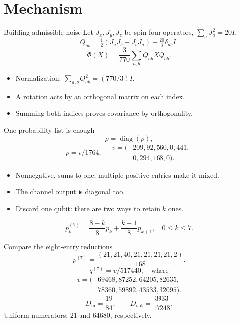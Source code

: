 \documentclass{beamer}
\begin{document}
\section{Mechanism}
\begin{frame}{Building admissible noise}
Let $J_x,J_y,J_z$ be spin-four operators, $\sum_aJ_a^2=20I$.
\[Q_{ab}=\tfrac12(J_aJ_b+J_bJ_a)-\tfrac{20}{3}\delta_{ab}I.\]
\[\Phi(X)=\frac3{770}\sum_{a,b}Q_{ab}XQ_{ab}.\]
\begin{itemize}
\item Normalization: $\sum_{a,b}Q_{ab}^2=(770/3)I$.
\item A rotation acts by an orthogonal matrix on each index.
\item Summing both indices proves covariance by orthogonality.
\end{itemize}
\end{frame}
\begin{frame}{One probability list is enough}
\[\rho=\operatorname{diag}(p),\]
\[p=v/1764,\quad
\begin{aligned}v=(&209,92,560,0,441,\\&0,294,168,0).\end{aligned}\]
\begin{itemize}
\item Nonnegative, sums to one; multiple positive entries make it mixed.
\item The channel output is diagonal too.
\item Discard one qubit: there are two ways to retain $k$ ones.
\end{itemize}
\[p_k^{(7)}=\frac{8-k}{8}p_k+\frac{k+1}{8}p_{k+1},\quad 0\leq k\leq7.\]
\end{frame}
\begin{frame}{Compare the eight-entry reductions}
\small
\[p^{(7)}=\frac{(21,21,40,21,21,21,21,2)}{168}.\]
\[q^{(7)}=v/517440,\quad\text{where}\]
\[\begin{aligned}v=(&69468,87252,64205,82635,\\&78360,59892,43533,32095).\end{aligned}\]
\normalsize
\[D_{\mathrm{in}}=\frac{19}{84},\qquad
D_{\mathrm{out}}=\frac{3933}{17248}.\]
Uniform numerators: $21$ and $64680$, respectively.
\end{frame}
\end{document}
